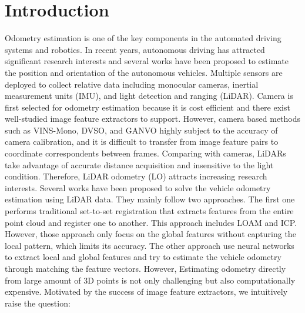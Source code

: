 \documentclass[sigconf]{acmart}
\begin{document}


\maketitle

\section{Introduction}

Odometry estimation is one of the key components in the automated driving systems and robotics. In recent years, autonomous driving has attracted significant research interests and several works have been proposed to estimate the position and orientation of the autonomous vehicles. Multiple sensors are deployed to collect relative data including monocular cameras, inertial measurement units (IMU), and light detection and ranging (LiDAR). Camera is first selected for odometry estimation because it is cost efficient and there exist well-studied image feature extractors to support. However, camera based methods such as VINS-Mono\cite{VINS-Mono}, DVSO\cite{DVSO}, and GANVO\cite{GANVO} highly subject to the accuracy of camera calibration, and it is difficult to transfer from image feature pairs to coordinate correspondents between frames. Comparing with cameras, LiDARs take advantage of accurate distance acquisition and insensitive to the light condition. Therefore, LiDAR odometry (LO) attracts increasing research interests. Several works have been proposed to solve the vehicle odometry estimation using LiDAR data. They mainly follow two approaches. The first one performs traditional set-to-set registration that extracts features from the entire point cloud and register one to another. This approach includes LOAM\cite{LOAM} and ICP\cite{ICP_l}\cite{GICP}\cite{ICP_p2plane}. However, those approach only focus on the global features without capturing the local pattern, which limits its accuracy. The other approach use neural networks to extract local and global features and try to estimate the vehicle odometry through matching the feature vectors. However, Estimating odometry directly from large amount of 3D points is not only challenging but also computationally expensive. Motivated by the success of image feature extractors, we intuitively raise the question: 
\end{document}
